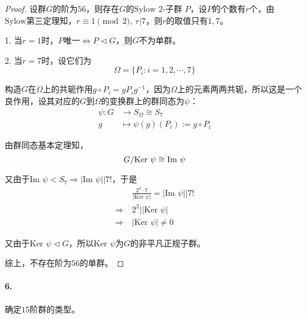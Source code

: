 \documentclass[12pt, a4paper, oneside]{ctexart}
\begin{document}
\begin{proof}
    设群$G$的阶为$56$，则存在$G$的$\text{Sylow 2-子群 }P$，设$P$的个数有$r$个，由$\text{Sylow第三定理}$知，$r\equiv 1\pmod 2,\ r|7$，则$r$的取值只有$1, 7$。

    1. 当$r=1$时，$P$唯一$\iff P\triangleleft G$，则$G$不为单群。

    2. 当$r=7$时，设它们为
    \begin{equation*}
        \Omega = \{P_i:i=1,2,\cdots,7\}
    \end{equation*}

    构造$G$在$\Omega$上的共轭作用$g\circ P_i = gP_ig^{-1}$，因为$\Omega$上的元素两两共轭，所以这是一个良作用，设其对应的$G$到$\Omega$的变换群上的群同态为$\psi$：
    \begin{equation*}
        \begin{aligned}
            \psi:G&\rightarrow S_{\Omega}\cong S_7\\
            g&\mapsto \psi(g)(P_i):=g\circ P_i
        \end{aligned}
    \end{equation*}

    由$\text{群同态基本定理}$知，
    \begin{equation*}
        G/\text{Ker }\psi\cong\text{Im }\psi\\
    \end{equation*}

    又由于$\text{Im }\psi < S_7\Rightarrow|\text{Im }\psi| \biggl| 7!$，于是
    \begin{equation*}
        \begin{aligned}
            &\frac{2^3\cdot 7}{|\text{Ker }\psi|}=|\text{Im }\psi|\biggl| 7!\\
            \Rightarrow\ &2^2\biggl | |\text{Ker }\psi|\\
            \Rightarrow\ &|\text{Ker }\psi|\neq 0
        \end{aligned}
    \end{equation*}

    又由于$\text{Ker }\psi\triangleleft G$，所以$\text{Ker }\psi$为$G$的非平凡正规子群。

    综上，不存在阶为$56$的单群。

\end{proof}
\paragraph{6.}确定$15$阶群的类型。
\end{document}
